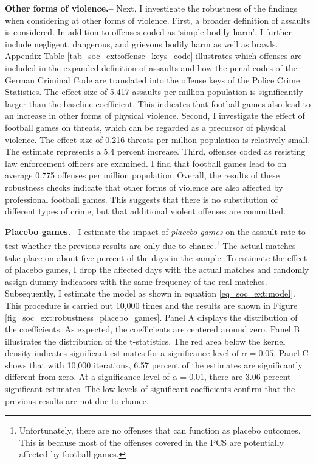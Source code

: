 \textbf{Other forms of violence.--} Next, I investigate the robustness of the findings when considering at other forms of violence. First, a broader definition of assaults is considered. In addition to offenses coded as `simple bodily harm', I further include negligent, dangerous, and grievous bodily harm as well as brawls. Appendix Table \ref{tab_soc_ext:offense_keys_code} illustrates which offenses are included in the expanded definition of assaults and how the penal codes of the German Criminal Code are translated into the offense keys of the Police Crime Statistics. The effect size of 5.417 assaults per million population is significantly larger than the baseline coefficient. This indicates that football games also lead to an increase in other forms of physical violence. Second, I investigate the effect of football games on threats, which can be regarded as a precursor of physical violence. The effect size of 0.216 threats per million population is relatively small. The estimate represents a 5.4 percent increase. Third, offenses coded as resisting law enforcement officers are examined. I find that football games lead to on average 0.775 offenses per million population. Overall, the results of these robustness checks indicate that other forms of violence are also affected by professional football games. This suggests that there is no substitution of different types of crime, but that additional violent offenses are committed.\newline


\textbf{Placebo games.--} I estimate the impact of \textit{placebo games} on the assault rate to test whether the previous results are only due to chance.\footnote{Unfortunately, there are no offenses that can function as placebo outcomes. This is because most of the offenses covered in the PCS are potentially affected by football games.} The actual matches take place on about five percent of the days in the sample. To estimate the effect of placebo games, I drop the affected days with the actual matches and randomly assign dummy indicators with the same frequency of the real matches. Subsequently, I estimate the model as shown in equation \ref{eq_soc_ext:model}. This procedure is carried out 10,000 times and the results are shown in Figure \ref{fig_soc_ext:robustness_placebo_games}. Panel A displays the distribution of the coefficients. As expected, the coefficients are centered around zero. Panel B illustrates the distribution of the t-statistics. The red area below the kernel density indicates significant estimates for a significance level of $\alpha=0.05$. Panel C shows that with 10,000 iterations, 6.57 percent of the estimates are significantly different from zero. At a significance level of $\alpha=0.01$, there are 3.06 percent significant estimates. The low levels of significant coefficients confirm that the previous results are not due to chance. 



